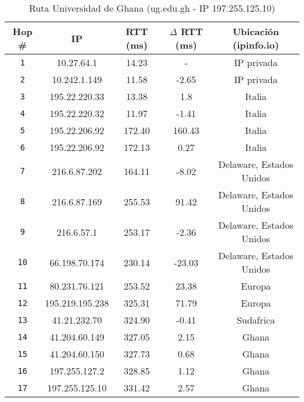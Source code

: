 \begin{table}[H]\begin{center}
    \begin{tabular}{|c|c|c|c|c|}
    \hline
    \textbf{Hop \#} & \textbf{IP} & \textbf{RTT (ms)} & \textbf{$\Delta$ RTT (ms)} & \textbf{Ubicación (ipinfo.io)} \\ \hline
    \texttt{1}  & 10.27.64.1      & 14.23             & -                     & IP privada                     \\ \hline
    \texttt{2}  & 10.242.1.149    & 11.58             & -2.65                 & IP privada                     \\ \hline
    \texttt{3}  & 195.22.220.33   & 13.38             & 1.8                   & Italia                         \\ \hline
    \texttt{4}  & 195.22.220.32   & 11.97             & -1.41                 & Italia                         \\ \hline
    \texttt{5}  & 195.22.206.92   & 172.40            & 160.43                & Italia                         \\ \hline
    \texttt{6}  & 195.22.206.92   & 172.13            & 0.27                  & Italia                         \\ \hline
    \texttt{7}  & 216.6.87.202    & 164.11            & -8.02                 & Delaware, Estados Unidos       \\ \hline
    \texttt{8}  & 216.6.87.169    & 255.53            & 91.42                 & Delaware, Estados Unidos       \\ \hline
    \texttt{9}  & 216.6.57.1      & 253.17            & -2.36                 & Delaware, Estados Unidos       \\ \hline
    \texttt{10} & 66.198.70.174   & 230.14            & -23.03                & Delaware, Estados Unidos       \\ \hline
    \texttt{11} & 80.231.76.121   & 253.52            & 23.38                 & Europa                         \\ \hline
    \texttt{12} & 195.219.195.238 & 325.31            & 71.79                 & Europa                         \\ \hline
    \texttt{13} & 41.21.232.70    & 324.90            & -0.41                 & Sudafrica                      \\ \hline
    \texttt{14} & 41.204.60.149   & 327.05            & 2.15                  & Ghana                          \\ \hline
    \texttt{15} & 41.204.60.150   & 327.73            & 0.68                  & Ghana                          \\ \hline
    \texttt{16} & 197.255.127.2   & 328.85            & 1.12                  & Ghana                          \\ \hline
    \texttt{17} & 197.255.125.10  & 331.42            & 2.57                  & Ghana                          \\ \hline
    \end{tabular}
    \caption{Ruta Universidad de Ghana (ug.edu.gh  - IP 197.255.125.10)}
\end{center}
\end{table}

